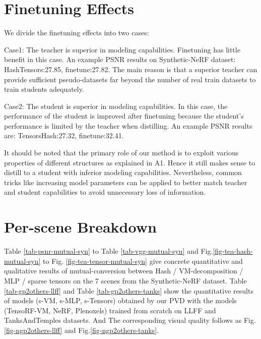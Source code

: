 \documentclass[letterpaper]{article} \usepackage{aaai23}  \usepackage{times}  \usepackage{helvet}  \usepackage{courier}  \usepackage[hyphens]{url}  \usepackage{graphicx} \urlstyle{rm} \def\UrlFont{\rm}  \usepackage{natbib}  \usepackage{caption} \frenchspacing  \setlength{\pdfpagewidth}{8.5in}  \setlength{\pdfpageheight}{11in}  \usepackage{multirow}
\begin{document}
\section{Finetuning Effects}
We divide the finetuning effects into two cases:

Case1: The teacher is superior in modeling capabilities.
Finetuning has little benefit in this case. An example PSNR results on Synthetic-NeRF dataset: HashTensors:27.85, finetune:27.82. The main reason is that a superior teacher can provide sufficient pseudo-datasets far beyond the number of real train datasets to train students adequately.

Case2: The student is superior in modeling capabilities.
In this case, the performance of the student is improved after finetuning because the student's performance is limited by the teacher when distilling. An example PSNR results are: TensorsHash:27.32, finetune:32.41.

It should be noted that the primary role of our method is to exploit various properties of different structures as explained in A1. Hence it still makes sense to distill to a student with inferior modeling capabilities. Nevertheless, common tricks like increasing model parameters can be applied to better match teacher and student capabilities to avoid unnecessary loss of information.

\section{Per-scene Breakdown}
Table \ref{tab-psnr-mutual-syn} to  Table \ref{tab-vgg-mutual-syn} and Fig.\ref{fig-tea-hash-mutual-syn} to Fig. \ref{fig-tea-tensor-mutual-syn} give concrete quantitative and qualitative results of mutual-conversion between Hash / VM-decomposition / MLP / sparse tensors on the 7 scenes from the Synthetic-NeRF dataset.
Table \ref{tab-gp2others-llff} and Table \ref{tab-gp2others-tanks} show the quantitative results of models (s-VM, s-MLP, s-Tensors) obtained by our PVD with the models (TensoRF-VM, NeRF, Plenoxels) trained from scratch on LLFF and TanksAndTemples datasets. And The corresponding visual quality follows as Fig.\ref{fig-ngp2others-llff} and Fig.\ref{fig-ngp2others-tanks}.
\end{document}
